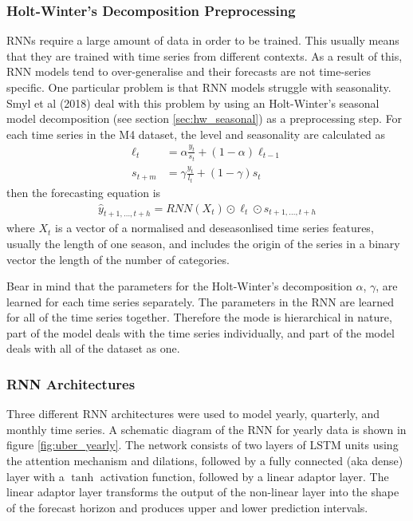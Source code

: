 \documentclass[a4paper,12pt]{article}
\theoremstyle{definition}
\begin{document}
\subsubsection{Holt-Winter's Decomposition Preprocessing}
RNNs require a large amount of data in order to be trained. This usually means that they are trained with time series from different contexts. As a result of this, RNN models tend to over-generalise and their forecasts are not time-series specific. One particular problem is that RNN models struggle with seasonality. Smyl et al (2018) deal with this problem by using an Holt-Winter's seasonal model decomposition (see section \ref{sec:hw_seasonal}) as a preprocessing step. For each time series in the M4 dataset, the level and seasonality are calculated as
\begin{align}
	\ell_{t} &= \alpha \frac{y_t}{s_t} + (1 - \alpha)\ell_{t-1} \\
	s_{t+m} &= \gamma\frac{y_t}{l_t} + (1 - \gamma)s_t
\end{align}
then the forecasting equation is
\begin{align}
	\hat{y}_{t+1, \dots, t+h} = RNN(X_t)\odot \ell_t \odot s_{t+1, \dots, t+h}
\end{align}
where $X_t$ is a vector of a normalised and deseasonlised time series features, usually the length of one season, and includes the origin of the series in a binary vector the length of the number of categories.

Bear in mind that the parameters for the Holt-Winter's decomposition $\alpha$, $\gamma$, are learned for each time series separately. The parameters in the RNN are learned for all of the time series together. Therefore the mode is hierarchical in nature, part of the model deals with the time series individually, and part of the model deals with all of the dataset as one.

\subsubsection{RNN Architectures}
Three different RNN architectures were used to model yearly, quarterly, and monthly time series. A schematic diagram of the RNN for yearly data is shown in figure \ref{fig:uber_yearly}. The network consists of two layers of LSTM units using the attention mechanism and dilations, followed by a fully connected (aka dense) layer with a $\tanh$ activation function, followed by a linear adaptor layer. The linear adaptor layer transforms the output of the non-linear layer into the shape of the forecast horizon and produces upper and lower prediction intervals.
\end{document}
